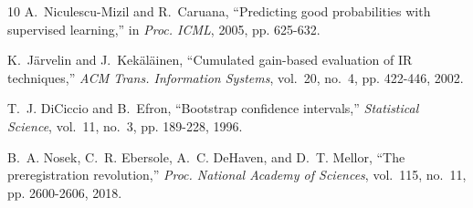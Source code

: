 \documentclass[journal]{IEEEtran}
\begin{document}
\begin{thebibliography}{10}
A.~Niculescu-Mizil and R.~Caruana, ``Predicting good probabilities with
  supervised learning,'' in \emph{Proc. ICML}, 2005, pp. 625-632.

K.~J\"arvelin and J.~Kek\"al\"ainen, ``Cumulated gain-based evaluation of IR
  techniques,'' \emph{ACM Trans. Information Systems}, vol.~20, no.~4, pp.
  422-446, 2002.

T.~J. DiCiccio and B.~Efron, ``Bootstrap confidence intervals,'' \emph{Statistical
  Science}, vol.~11, no.~3, pp. 189-228, 1996.

B.~A. Nosek, C.~R. Ebersole, A.~C. DeHaven, and D.~T. Mellor, ``The
  preregistration revolution,'' \emph{Proc. National Academy of Sciences},
  vol.~115, no.~11, pp. 2600-2606, 2018.

\end{thebibliography}
\end{document}
